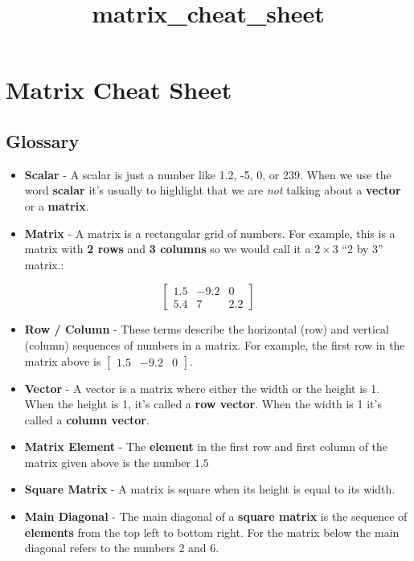 \documentclass[11pt]{article}
\title{matrix\_cheat\_sheet}
\providecommand{\tightlist}{%
      \setlength{\itemsep}{0pt}\setlength{\parskip}{0pt}}
\begin{document}
    
    
    \maketitle
    
    

    
    \hypertarget{matrix-cheat-sheet}{%
\section{Matrix Cheat Sheet}\label{matrix-cheat-sheet}}

\hypertarget{glossary}{%
\subsection{Glossary}\label{glossary}}

\begin{itemize}
\tightlist
\item
  \textbf{Scalar} - A scalar is just a number like 1.2, -5, 0, or 239.
  When we use the word \textbf{scalar} it's usually to highlight that we
  are \emph{not} talking about a \textbf{vector} or a \textbf{matrix}.
\item
  \textbf{Matrix} - A matrix is a rectangular grid of numbers. For
  example, this is a matrix with \textbf{2 rows} and \textbf{3 columns}
  so we would call it a \(2\times 3\) ``2 by 3'' matrix.:
\end{itemize}

\[\begin{bmatrix}1.5 & -9.2 & 0 \\
5.4 & 7 & 2.2\end{bmatrix}\]

\begin{itemize}
\item
  \textbf{Row / Column} - These terms describe the horizontal (row) and
  vertical (column) sequences of numbers in a matrix. For example, the
  first row in the matrix above is
  \(\begin{bmatrix}1.5 & -9.2 & 0\end{bmatrix}\).
\item
  \textbf{Vector} - A vector is a matrix where either the width or the
  height is 1. When the height is 1, it's called a \textbf{row vector}.
  When the width is 1 it's called a \textbf{column vector}.
\item
  \textbf{Matrix Element} - The \textbf{element} in the first row and
  first column of the matrix given above is the number \(1.5\)
\item
  \textbf{Square Matrix} - A matrix is square when its height is equal
  to its width.
\item
  \textbf{Main Diagonal} - The main diagonal of a \textbf{square matrix}
  is the sequence of \textbf{elements} from the top left to bottom
  right. For the matrix below the main diagonal refers to the numbers 2
  and 6.
\end{itemize}
\end{document}
